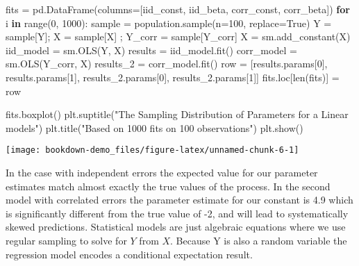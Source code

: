 \documentclass[]{tufte-book}
\newenvironment{Shaded}{}{}
\newcommand{\BuiltInTok}[1]{#1}
\newcommand{\ControlFlowTok}[1]{\textcolor[rgb]{0.00,0.44,0.13}{\textbf{#1}}}
\newcommand{\DecValTok}[1]{\textcolor[rgb]{0.25,0.63,0.44}{#1}}
\newcommand{\KeywordTok}[1]{\textcolor[rgb]{0.00,0.44,0.13}{\textbf{#1}}}
\newcommand{\NormalTok}[1]{#1}
\newcommand{\OperatorTok}[1]{\textcolor[rgb]{0.40,0.40,0.40}{#1}}
\newcommand{\StringTok}[1]{\textcolor[rgb]{0.25,0.44,0.63}{#1}}
\newcommand{\VariableTok}[1]{\textcolor[rgb]{0.10,0.09,0.49}{#1}}
\theoremstyle{definition}
\theoremstyle{definition}
\theoremstyle{definition}
\theoremstyle{remark}
\begin{document}
\begin{Shaded}
\begin{Highlighting}[]
\NormalTok{fits }\OperatorTok{=}\NormalTok{ pd.DataFrame(columns}\OperatorTok{=}\NormalTok{[}\StringTok{\textquotesingle{}iid\_const\textquotesingle{}}\NormalTok{, }\StringTok{\textquotesingle{}iid\_beta\textquotesingle{}}\NormalTok{, }
\StringTok{\textquotesingle{}corr\_const\textquotesingle{}}\NormalTok{, }\StringTok{\textquotesingle{}corr\_beta\textquotesingle{}}\NormalTok{])}
\ControlFlowTok{for}\NormalTok{ i }\KeywordTok{in} \BuiltInTok{range}\NormalTok{(}\DecValTok{0}\NormalTok{, }\DecValTok{1000}\NormalTok{):}
\NormalTok{    sample }\OperatorTok{=}\NormalTok{ population.sample(n}\OperatorTok{=}\DecValTok{100}\NormalTok{, replace}\OperatorTok{=}\VariableTok{True}\NormalTok{)}
\NormalTok{    Y }\OperatorTok{=}\NormalTok{ sample[}\StringTok{\textquotesingle{}Y\textquotesingle{}}\NormalTok{]}\OperatorTok{;}\NormalTok{ X }\OperatorTok{=}\NormalTok{ sample[}\StringTok{\textquotesingle{}X\textquotesingle{}}\NormalTok{] }\OperatorTok{;}\NormalTok{ Y\_corr }\OperatorTok{=}\NormalTok{ sample[}\StringTok{\textquotesingle{}Y\_corr\textquotesingle{}}\NormalTok{]}
\NormalTok{    X }\OperatorTok{=}\NormalTok{ sm.add\_constant(X)}
\NormalTok{    iid\_model }\OperatorTok{=}\NormalTok{ sm.OLS(Y, X)}
\NormalTok{    results }\OperatorTok{=}\NormalTok{ iid\_model.fit()}
\NormalTok{    corr\_model }\OperatorTok{=}\NormalTok{ sm.OLS(Y\_corr, X)}
\NormalTok{    results\_2 }\OperatorTok{=}\NormalTok{ corr\_model.fit()}
\NormalTok{    row }\OperatorTok{=}\NormalTok{ [results.params[}\DecValTok{0}\NormalTok{], results.params[}\DecValTok{1}\NormalTok{], results\_2.params[}\DecValTok{0}\NormalTok{], results\_2.params[}\DecValTok{1}\NormalTok{]]}
\NormalTok{    fits.loc[}\BuiltInTok{len}\NormalTok{(fits)] }\OperatorTok{=}\NormalTok{ row}


\NormalTok{fits.boxplot()}
\NormalTok{plt.suptitle(}\StringTok{"The Sampling Distribution of Parameters for a Linear models"}\NormalTok{)}
\NormalTok{plt.title(}\StringTok{"Based on 1000 fits on 100 observations"}\NormalTok{)}
\NormalTok{plt.show()}
\end{Highlighting}
\end{Shaded}

\texttt{[image: bookdown-demo\_files/figure-latex/unnamed-chunk-6-1]}

In the case with independent errors the expected value for our parameter estimates match almost exactly the true values of the process. In the second model with correlated errors the parameter estimate for our constant is 4.9 which is significantly different from the true value of -2, and will lead to systematically skewed predictions. Statistical models are just algebraic equations where we use regular sampling to solve for \(Y\) from \(X\). Because Y is also a random variable the regression model encodes a conditional expectation result.
\end{document}
